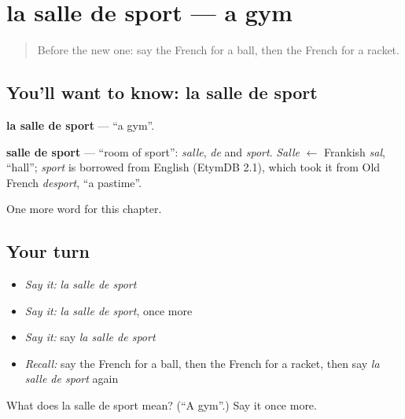 \section[la salle de sport]{la salle de sport — a gym}

\label{lesson:FR-C173-salle-de-sport}



\begin{quote}
Before the new one: say the French for a ball, then the French for a racket.
\end{quote}

\subsection*{You'll want to know: la salle de sport}
\textbf{la salle de sport} — \textquotedblleft{}a gym\textquotedblright{}.

\begin{cousinweb}
\textbf{salle de sport} — \textquotedblleft{}room of sport\textquotedblright{}: \emph{salle}, \emph{de} and \emph{sport}. \emph{Salle} $\leftarrow$ Frankish \emph{sal}, \textquotedblleft{}hall\textquotedblright{}; \emph{sport} is borrowed from English (EtymDB 2.1), which took it from Old French \emph{desport}, \textquotedblleft{}a pastime\textquotedblright{}.
\end{cousinweb}

\begin{grammarlens}[title={What you've built}]
One more word for this chapter.
\end{grammarlens}

\subsection*{Your turn}
\begin{itemize}
\raggedright
  \item \emph{Say it:} \emph{la salle de sport}
  \item \emph{Say it:} \emph{la salle de sport}, once more
  \item \emph{Say it:} say \emph{la salle de sport}
  \item \emph{Recall:} say the French for a ball, then the French for a racket, then say \emph{la salle de sport} again
\end{itemize}

\begin{tcolorbox}[breakable,colback=teal!4,colframe=teal!35!black,title={Before you move on}]
What does la salle de sport mean? (\textquotedblleft{}A gym\textquotedblright{}.) Say it once more.
\end{tcolorbox}

